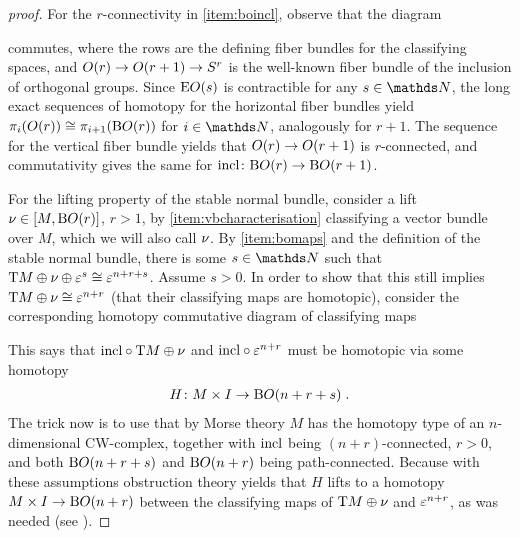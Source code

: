 \begin{Lem}
\begin{proof}[proof]
    For the $r$-connectivity in \ref{item:boincl}, observe that
    the diagram
    \begin{center}
    \end{center}
    commutes, where the rows are the defining fiber bundles for the
    classifying spaces, and $O(r)\to O(r+1)\to S^{r}$
    is the well-known fiber bundle of the inclusion of orthogonal groups.
    Since $\mathrm{E}O(s)$ is contractible for any $s\in\Nat$, 
    the long exact sequences of homotopy for the horizontal fiber bundles yield
    $\pi_i(O(r))\cong\pi_{i+1}(\mathrm{B}O(r))$ for $i\in\Nat$, analogously for $r+1$.
    The sequence for the vertical fiber bundle yields that
    $O(r)\to O(r+1)$ is $r$-connected, and commutativity gives
    the same for $\mathrm{incl}\colon\mathrm{B}O(r)\to\mathrm{B}O(r+1)$.
    
    For the lifting property of the stable normal bundle, consider a
    lift $\nu_{}\in[M,\mathrm{B}O(r)]$, $r>1$, by \ref{item:vbcharacterisation}
    classifying a vector bundle over $M$, which we will also call
    $\nu_{}$. By \ref{item:bomaps} and the definition
    of the stable normal bundle, there is some $s\in\Nat$
    such that $\mathrm{T}M\oplus\nu_{}\oplus\varepsilon^s\cong\varepsilon^{n+r+s}$.
    Assume $s>0$.
    In order to show that this still implies
    $\mathrm{T}M\oplus\nu_{}\cong\varepsilon^{n+r}$ (\idest that their
    classifying maps are homotopic), consider the corresponding
    homotopy commutative diagram of classifying maps
    \begin{center}
    \end{center}
    This says that $\mathrm{incl}\circ\mathrm{T}M\oplus\nu_{}$ and
    $\mathrm{incl}\circ\varepsilon^{n+r}$ must be homotopic via
    some homotopy
    \begin{gather*}
      H\colon M\times I\to\mathrm{B}O(n+r+s) \;.
    \end{gather*}
    The trick now is to use that by Morse theory $M$ has the homotopy
    type of an $n$-dimensional CW-complex, together with $\mathrm{incl}$ being
    $(n+r)$-connected, $r>0$, and both $\mathrm{B}O(n+r+s)$ and $\mathrm{B}O(n+r)$
    being path-connected. Because with these assumptions
    obstruction theory yields that
    $H$ lifts to a homotopy $M\times I\to\mathrm{B}O(n+r)$ between
    the classifying maps of $\mathrm{T}M\oplus\nu_{}$ and $\varepsilon^{n+r}$, as
    was needed
    (see \forexample \cite[Lemma~4.6]{hatcher}).
  \end{proof}
\end{Lem}
